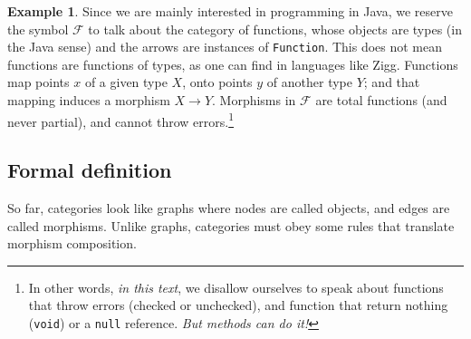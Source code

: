 \documentclass[12pt,a4paper]{report}
\theoremstyle{theorem}
\theoremstyle{definition}
\newtheorem{example}{Example}
\begin{document}
\begin{example}
Since we are mainly interested in programming in Java,
we reserve the symbol
$\mathcal{F}$ to talk about the category of functions,
whose objects are types (in the Java sense) and the arrows
are instances of \lstinline{Function}{}. 
This does not mean functions are
functions of types, as one can find in languages like Zigg.
Functions map points $x$ of a given type $X$,
onto points $y$ of another type $Y$;
and that mapping induces a morphism $X\to Y$.
Morphisms in $\mathcal{F}$
are total functions (and never partial), and cannot throw errors.\footnote{In
other words, \emph{in this text}, we disallow ourselves to speak about functions
that throw errors (checked or unchecked), and function that return nothing
(\lstinline{void}{}) or a \lstinline{null}{} reference. \emph{But methods
can do it!}}
\end{example}

\pagebreak

\subsection{Formal definition}

So far, categories look like graphs where nodes are called objects,
and edges are called morphisms. Unlike graphs, categories
must obey some rules that translate morphism composition.
\end{document}
